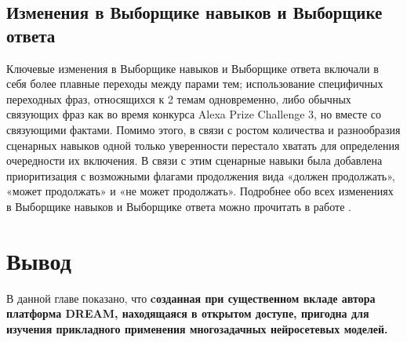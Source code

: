 \subsection{Изменения в Выборщике навыков и Выборщике ответа}

Ключевые изменения в Выборщике навыков и Выборщике ответа включали в себя более плавные переходы между парами тем; использование специфичных переходных фраз, относящихся к 2 темам одновременно, либо обычных связующих фраз как во время конкурса Alexa Prize Challenge 3, но вместе со связующими фактами.
Помимо этого, в связи с ростом количества и разнообразия сценарных навыков одной только уверенности перестало хватать для определения очередности их включения. В связи с этим сценарные навыки была добавлена приоритизация с возможными флагами продолжения вида «должен продолжать», «может продолжать» и «не может продолжать».
Подробнее обо всех изменениях в Выборщике навыков и Выборщике ответа можно прочитать в работе \cite{dream2}.

\section{Вывод}

В данной главе показано, что \textbf{cозданная при существенном вкладе автора платформа DREAM, находящаяся в открытом доступе, пригодна для изучения прикладного применения многозадачных нейросетевых моделей.}